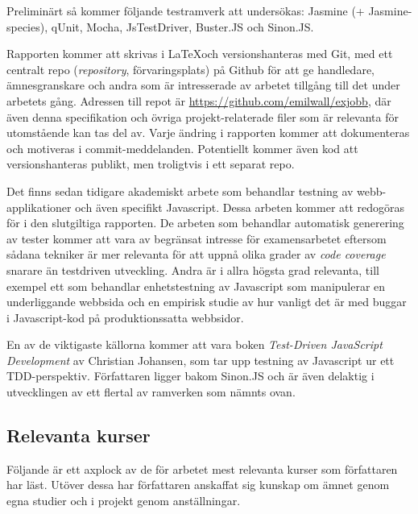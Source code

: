 \documentclass[11pt]{article}
\begin{document}
Preliminärt så kommer följande testramverk att undersökas: Jasmine\cite{JasmineSite} (+ Jasmine-species\cite{JasmineSpecies}), qUnit\cite{QUnitSite}, Mocha\cite{MochaSite}, JsTestDriver\cite{JsTestDriver}, Buster.JS\cite{BusterJS} och Sinon.JS\cite{SinonJS}.

Rapporten kommer att skrivas i \LaTeX och versionshanteras med Git, med ett centralt repo (\textit{\foreignlanguage{english}{repository}}, förvaringsplats) på Github för att ge handledare, ämnesgranskare och andra som är intresserade av arbetet tillgång till det under arbetets gång. Adressen till repot är \url{https://github.com/emilwall/exjobb}, där även denna specifikation och övriga projekt-relaterade filer som är relevanta för utomstående kan tas del av. Varje ändring i rapporten kommer att dokumenteras och motiveras i commit-meddelanden. Potentiellt kommer även kod att versionshanteras publikt, men troligtvis i ett separat repo.

Det finns sedan tidigare akademiskt arbete som behandlar testning av webb-applikationer och även specifikt Javascript. Dessa arbeten kommer att redogöras för i den slutgiltiga rapporten. De arbeten som behandlar automatisk generering av tester\cite{AutomatedTesting} kommer att vara av begränsat intresse för examensarbetet eftersom sådana tekniker är mer relevanta för att uppnå olika grader av \textit{\foreignlanguage{english}{code coverage}} snarare än testdriven utveckling. Andra är i allra högsta grad relevanta, till exempel ett som behandlar enhetstestning av Javascript som manipulerar en underliggande webbsida\cite{DOMJavascript} och en empirisk studie av hur vanligt det är med buggar i Javascript-kod på produktionssatta webbsidor\cite{Wild}.

En av de viktigaste källorna kommer att vara boken \textit{\foreignlanguage{english}{Test-Driven JavaScript Development}}\cite{Tddjs} av Christian Johansen, som tar upp testning av Javascript ur ett TDD-perspektiv. Författaren ligger bakom Sinon.JS\cite{SinonJS} och är även delaktig i utvecklingen av ett flertal av ramverken som nämnts ovan.

\subsection{Relevanta kurser}

Följande är ett axplock av de för arbetet mest relevanta kurser som författaren har läst. Utöver dessa har författaren anskaffat sig kunskap om ämnet genom egna studier och i projekt genom anställningar.
\end{document}
